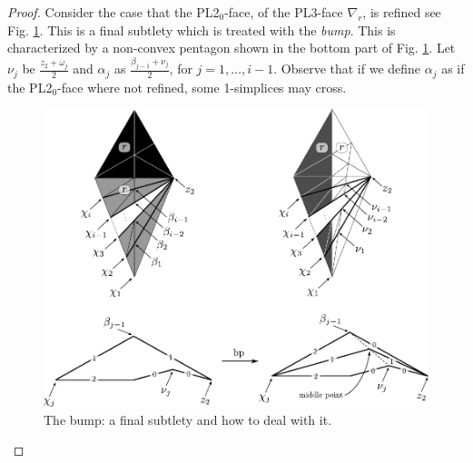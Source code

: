 \begin{proof}
Consider the case that the PL2$_0$-face, of the PL3-face $\nabla_r$, is refined
see Fig. \ref{fig:3d6}.
 This is a final subtlety which 
is treated with the {\em bump}.  This is characterized by a
non-convex pentagon shown in the bottom part of Fig. \ref{fig:3d6}.
Let $\nu_j$ be $\frac{z_2+\omega_j}{2}$
and $\alpha_j$ as $\frac{\beta_{j-1}+\nu_j}{2}$, for $j=1,\ldots, i-1$. Observe that
if we define $\alpha_j$ as if the PL2$_0$-face
where not refined, some 1-simplices may cross.



\begin{figure}[!htb] 
\begin{center}
\includegraphics[scale=0.7]{A.figs/3d6.pdf}
\caption{The bump: a final subtlety and how to deal with it.}
\label{fig:3d6}
\end{center}
\end{figure}

\end{proof}

